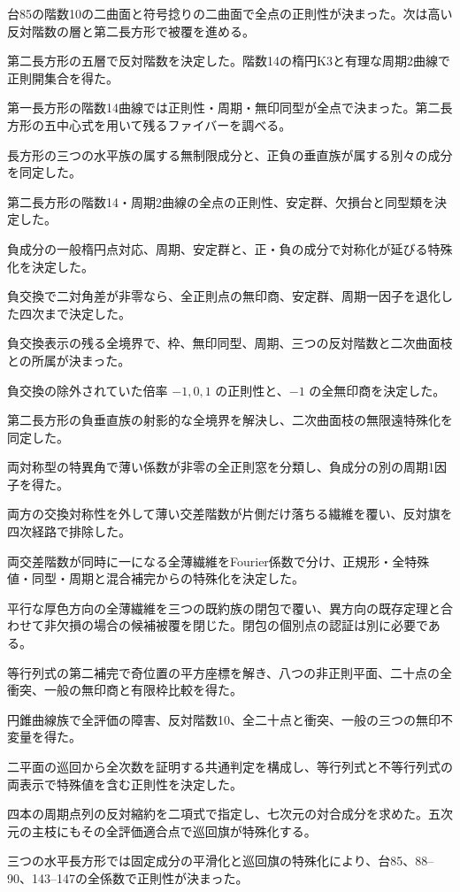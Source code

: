 \documentclass[11pt,a4paper]{ltjsarticle}
\begin{document}
台85の階数10の二曲面と符号捻りの二曲面で全点の正則性が決まった。次は高い反対階数の層と第二長方形で被覆を進める。

第二長方形の五層で反対階数を決定した。階数14の楕円K3と有理な周期2曲線で正則開集合を得た。

第一長方形の階数14曲線では正則性・周期・無印同型が全点で決まった。第二長方形の五中心式を用いて残るファイバーを調べる。

長方形の三つの水平族の属する無制限成分と、正負の垂直族が属する別々の成分を同定した。

第二長方形の階数14・周期2曲線の全点の正則性、安定群、欠損台と同型類を決定した。

負成分の一般楕円点対応、周期、安定群と、正・負の成分で対称化が延びる特殊化を決定した。

負交換で二対角差が非零なら、全正則点の無印商、安定群、周期一因子を退化した四次まで決定した。

負交換表示の残る全境界で、枠、無印同型、周期、三つの反対階数と二次曲面枝との所属が決まった。

負交換の除外されていた倍率 $-1,0,1$ の正則性と、$-1$ の全無印商を決定した。

第二長方形の負垂直族の射影的な全境界を解決し、二次曲面枝の無限遠特殊化を同定した。

両対称型の特異角で薄い係数が非零の全正則窓を分類し、負成分の別の周期1因子を得た。

両方の交換対称性を外して薄い交差階数が片側だけ落ちる繊維を覆い、反対旗を四次経路で排除した。

両交差階数が同時に一になる全薄繊維をFourier係数で分け、正規形・全特殊値・同型・周期と混合補完からの特殊化を決定した。

平行な厚色方向の全薄繊維を三つの既約族の閉包で覆い、異方向の既存定理と合わせて非欠損の場合の候補被覆を閉じた。閉包の個別点の認証は別に必要である。

等行列式の第二補完で奇位置の平方座標を解き、八つの非正則平面、二十点の全衝突、一般の無印商と有限枠比較を得た。

円錐曲線族で全評価の障害、反対階数10、全二十点と衝突、一般の三つの無印不変量を得た。

二平面の巡回から全次数を証明する共通判定を構成し、等行列式と不等行列式の両表示で特殊値を含む正則性を決定した。

四本の周期点列の反対縮約を二項式で指定し、七次元の対合成分を求めた。五次元の主枝にもその全評価適合点で巡回旗が特殊化する。

三つの水平長方形では固定成分の平滑化と巡回旗の特殊化により、台85、88--90、143--147の全係数で正則性が決まった。
\end{document}
